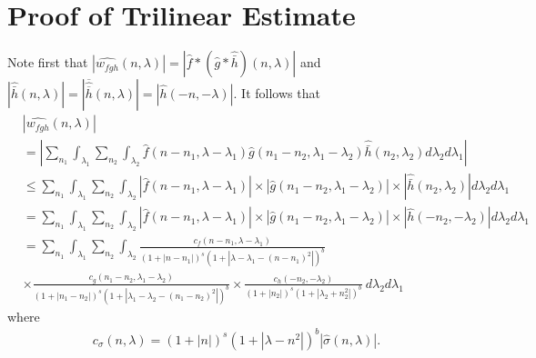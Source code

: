 \documentclass[12pt,reqno]{amsart}
\numberwithin{equation}{section}  %
\newcommand{\wh}{\widehat}
\begin{document}
\section{Proof of Trilinear Estimate}
%
%
%
%
%
%
Note first that $|\wh{w_{fgh}}(n, \lambda) |  = | \wh{f} * ( \wh{g} 
* \wh{\bar h})(n, \lambda)|$ and $| \wh{\bar{h}}(n, \lambda) | = |\overline{ \wh{\overline{h}} 
}(n, \lambda)| = | \wh{h}(-n, -\lambda) |$. It follows that
%
%
\begin{equation}
	\label{nnon-lin-rep}
	\begin{split}
		& | \wh{w_{fgh}}(n, \lambda)|
    \\
    & = |  \sum_{n_{1} } \int_{\lambda_{1}} \sum_{n_{2}}
    \int_{\lambda_{2}} \wh{f}\left( n
    -n_1,  \lambda - \lambda_1 \right) \wh{g}\left( n_{1} - n_2, \lambda_{1} - \lambda_2  
\right) \wh{\bar h}\left( n_2, \lambda_2 \right) d \lambda_2 d \lambda_1 |
\\
& \le \sum_{n_{1} } \int_{\lambda_{1}} \sum_{n_{2}}
\int_{\lambda_{2}}  | \wh{f}\left( n - n_1, \lambda - \lambda_1 
\right) | \times  | \wh{g}\left( n_1 - n_2, \lambda_1 - \lambda_2 
\right) | \times | \wh{\bar h}\left( n_{2}, \lambda_{2} \right) | d \lambda_2 d \lambda_1
\\
& = \sum_{n_{1} } \int_{\lambda_{1}} \sum_{n_{2}}
\int_{\lambda_{2}}  | \wh{f}\left( n - n_1, \lambda - \lambda_1 
     \right) | \times | \wh{g}\left( n_{1} - n_2, \lambda_{1} - \lambda_2 
\right) | \times | \wh{h}\left( -n_{2}, - \lambda_2 \right) | d \lambda_2 d \lambda_1
\\
& = \sum_{n_{1} } \int_{\lambda_{1}} \sum_{n_{2}}
\int_{\lambda_{2}} \frac{c_f\left( n - n_1, \lambda - \lambda_1 
\right)}{\left (1 + |n - n_{1}| \right )^s \left( 1 + | \lambda - \lambda_1 - (n - n_{1})^{2} | \right)^{b}}
\\
& \times \frac{c_{g}\left( n_1 - n_2, \lambda_1 - \lambda_2 \right)}{\left (1 + |n_1 -
n_2| \right ) 
^s\left( 1 + | \lambda_1 - \lambda_2 -  (n_1 - n_2)^{2}| 
\right)^{b}}
 \times \frac{c_{h}\left( -n_{2}, -\lambda_2 \right)}{\left (1 + |n_{2}| \right ) ^s\left( 1 + | 
\lambda_2 + n_{2}^{2} | \right)^{b}} \ d \lambda_2 d \lambda_1
\end{split}
\end{equation}
%
%
where
%
%
\begin{equation*}
	\begin{split}
		c_\sigma(n, \lambda) = \left (1 + |n| \right ) ^s \left( 1 + | \lambda - n^{2} |  
		\right)^{b} | \wh{\sigma}\left( n, \lambda \right) | .
	\end{split}
\end{equation*}
\end{document}
